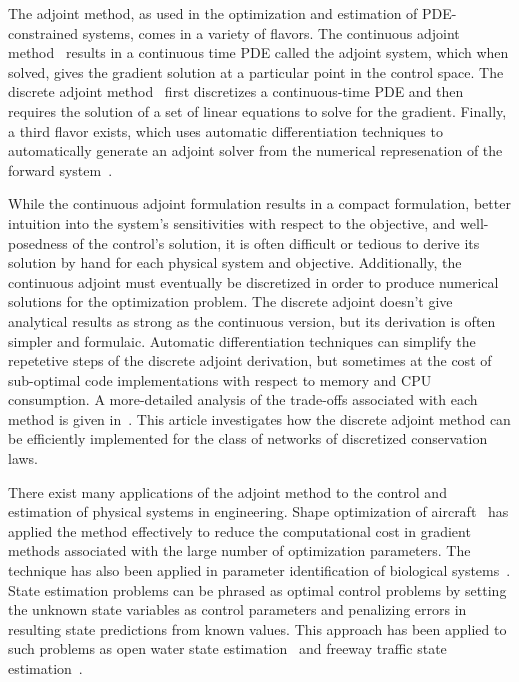The adjoint method, as used in the optimization and estimation of PDE-constrained systems, comes in a variety of flavors. The continuous adjoint method~\cite{Jacquet2005,Gugat2005,Moin1994,Reuther1996} results in a continuous time PDE called the adjoint system, which when solved, gives the gradient solution at a particular point in the control space. The discrete adjoint method~\cite{Giles2000,Gugat2005,Kotsialos2004} first discretizes a continuous-time PDE and then requires the solution of a set of linear equations to solve for the gradient. Finally, a third flavor exists, which uses automatic differentiation techniques to automatically generate an adjoint solver from the numerical represenation of the forward system~\cite{Giering1998,Muller2005}.

While the continuous adjoint formulation results in a compact formulation, better intuition into the system's sensitivities with respect to the objective, and well-posedness of the control's solution, it is often difficult or tedious to derive its solution by hand for each physical system and objective. Additionally, the continuous adjoint must eventually be discretized in order to produce numerical solutions for the optimization problem. The discrete adjoint doesn't give analytical results as strong as the continuous version, but its derivation is often simpler and formulaic. Automatic differentiation techniques can simplify the repetetive steps of the discrete adjoint derivation, but sometimes at the cost of sub-optimal code implementations with respect to memory and CPU consumption. A more-detailed analysis of the trade-offs associated with each method is given in~\cite{Giles}. This article investigates how the discrete adjoint method can be efficiently implemented for the class of networks of discretized conservation laws.

There exist many applications of the adjoint method to the control and estimation of physical systems in engineering. Shape optimization of aircraft~\cite{Reuther1996,Giles1997,Moin1994} has applied the method effectively to reduce the computational cost in gradient methods associated with the large number of optimization parameters. The technique has also been applied in parameter identification of biological systems~\cite{Raffard2008}. State estimation problems can be phrased as optimal control problems by setting the unknown state variables as control parameters and penalizing errors in resulting state predictions from known values. This approach has been applied to such problems as open water state estimation~\cite{Castaings2006,Strub2009} and freeway traffic state estimation~\cite{Jacqueta}.


